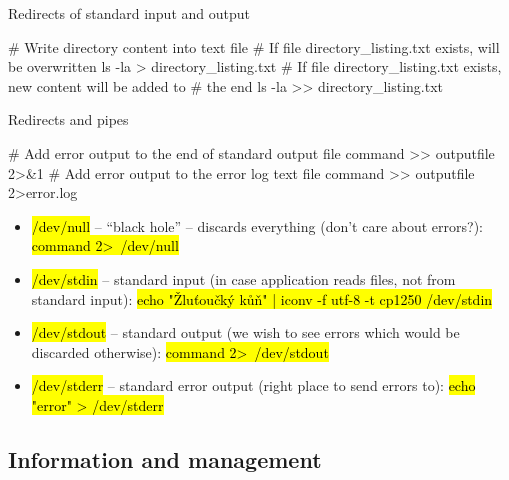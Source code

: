 \documentclass[compress, ucs, xelatex, 11pt, xcolor=svgnames,
  hyperref={
    bookmarks=true,
    unicode=true,
    colorlinks=true,
    pdftitle={Linux, command line and MetaCentrum},
    plainpages=false,
    pdfauthor={Vojtech Zeisek},
    pdfsubject={Course about use of Linux command line, writing shell scripts and using MetaCentrum of CESNET},
    pdfcreator={XeLaTeX},
    pdfkeywords={Linux, GNU, BASH, shell, command line, MetaCentrum},
    linkcolor=Red,
    anchorcolor=Blue,
    citecolor=Purple,
    filecolor=DodgerBlue,
    menucolor=DarkOrchid,
    urlcolor=DeepSkyBlue,
    pdftex},
  url={hyphens, lowtilde} %
  ]{beamer}
\renewcommand{\texttt}[1]{\hl{\ttfamily #1}}
\begin{document}
\begin{frame}[fragile]{Redirects of standard input and output}
  \begin{bashcode}
    # Write directory content into text file
    # If file directory_listing.txt exists, will be overwritten
    ls -la > directory_listing.txt
    # If file directory_listing.txt exists, new content will be added to
    # the end
    ls -la >> directory_listing.txt
  \end{bashcode}
\end{frame}

\begin{frame}[fragile, label=pipe]{Redirects and pipes}
  \begin{bashcode}
    # Add error output to the end of standard output file
    command >> outputfile 2>&1
    # Add error output to the error log text file
    command >> outputfile 2>error.log
  \end{bashcode}
\begin{itemize}
  \item \texttt{/dev/null} -- ``black hole'' -- discards everything (don't care about errors?): \texttt{command 2\textgreater~/dev/null}
  \item \texttt{/dev/stdin} -- standard input (in case application reads files, not from standard input): \texttt{echo "Žluťoučký kůň" | iconv -f utf-8 -t cp1250 /dev/stdin}
  \item \texttt{/dev/stdout} -- standard output (we wish to see errors which would be discarded otherwise): \texttt{command 2\textgreater~/dev/stdout}
  \item \texttt{/dev/stderr} -- standard error output (right place to send errors to): \texttt{echo "error" > /dev/stderr}
\end{itemize}
\end{frame}

\subsection{Information and management}
\end{document}
